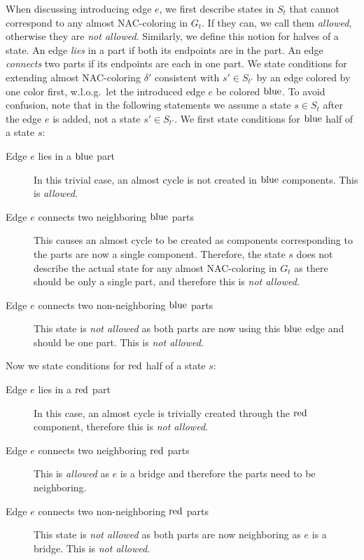 When discussing \IntroduceEdgeNode{} introducing edge \( e \),
we first describe states in \( S_{t} \)
that cannot correspond to any almost NAC-coloring in \( G_t \).
If they can, we call them \emph{allowed}, otherwise they are \emph{not allowed}.
Similarly, we define this notion for halves of a state.
%
An edge \emph{lies} in a part if both its endpoints are in the part.
An edge \emph{connects} two parts if its endpoints are each in one part.
%
We state conditions for extending almost NAC-coloring \( \delta' \)
consistent with \( s' \in S_{t'} \)
by an edge colored by one color first,
w.l.o.g.\ let the introduced edge \( e \) be colored \( \text{blue} \).
%
To avoid confusion, note that in the following statements we assume
a state \( s \in S_t \) after the edge \( e \) is added, not a state \( s' \in S_{t'} \).
%
We first state conditions for \( \text{blue} \) half of a state \( s \):
%
\begin{description}
	\item[Edge \( e \) lies in a \( \text{blue} \) part]
	      In this trivial case, an almost cycle is not created in \( \text{blue} \) components.
	      This is \emph{allowed}.
	\item[Edge \( e \) connects two neighboring \( \text{blue} \) parts]
	      This causes an almost cycle to be created as
	      components corresponding to the parts
	      are now a single component.
	      Therefore, the state \( s \) does not describe
	      the actual state for any almost NAC-coloring in \( G_t \)
	      as there should be only a single part, and therefore this is \emph{not allowed}.
	\item[Edge \( e \) connects two non-neighboring \( \text{blue} \) parts]
	      This state is \emph{not allowed} as both parts
	      are now using this \( \text{blue} \) edge and should be one part.
	      This is \emph{not allowed}.
\end{description}
%
Now we state conditions for \( \text{red} \) half of a state \( s \):
%
\begin{description}
	\item[Edge \( e \) lies in a \( \text{red} \) part]
	      In this case, an almost cycle is trivially created
	      through the \( \text{red} \) component,
	      therefore this is \emph{not allowed}.
	\item[Edge \( e \) connects two neighboring \( \text{red} \) parts]
	      This is \emph{allowed} as \( e \) is a bridge and
	      therefore the parts need to be neighboring.
	\item[Edge \( e \) connects two non-neighboring \( \text{red} \) parts]
	      This state is \emph{not allowed} as both parts
	      are now neighboring as \( e \) is a bridge.
	      This is \emph{not allowed}.
\end{description}
%

